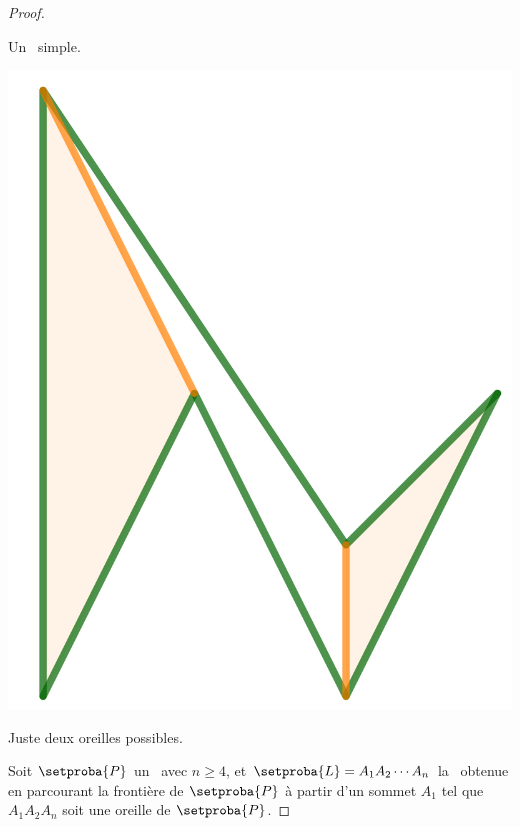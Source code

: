 \begin{proof}
\begin{multicols}{2}
\begin{center}
        	\smallskip
       		Un \ngone\ simple.
    	\end{center}
	
    	\begin{center}
        	\includegraphics[scale=.4]{content/polygon/sufficient-cond/mini-ear-2.png}
        
        	\smallskip
       		Juste deux oreilles possibles.
    	\end{center}
    \end{multicols}
    
    
    
    Soit $\setproba{P}$ un \ngone\ avec $n \geq 4$, et $\setproba{L} = A_1 A_2 \cdots A_n$ la \nline\ obtenue en parcourant la frontière de $\setproba{P}$ à partir d'un sommet $A_1$ tel que $A_1 A_2 A_n$ soit une oreille de $\setproba{P}$.
    

\end{proof}
